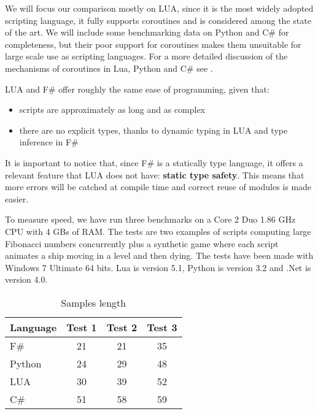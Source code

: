 
We will focus our comparison mostly on LUA, since it is the most widely adopted scripting language, it fully supports coroutines and is considered among the state of the art. We will include some benchmarking data on Python and C\# for completeness, but their poor support for coroutines makes them unsuitable for large scale use as scripting languages. For a more detailed discussion of the mechanisms of coroutines in Lua, Python and C\# see \cite{PYTHON_COROUTINES,LUA_COROUTINES,CSHARP_YIELD}.

LUA and F\# offer roughly the same ease of programming, given that:

\begin{itemize}
\item scripts are approximately as long and as complex
\item there are no explicit types, thanks to dynamic typing in LUA and type inference in F\#
\end{itemize}

It is important to notice that, since F\# is a statically type language, it offers a relevant feature that LUA does not have: \textbf{static type safety}. This means that more errors will be catched at compile time and correct reuse of modules is made easier.

To measure speed, we have run three benchmarks on a Core 2 Duo 1.86 GHz CPU with 4 GBs of RAM. The tests are two examples of scripts computing large Fibonacci numbers concurrently plus a synthetic game where each script animates a ship moving in a level and then dying. The tests have been made with Windows 7 Ultimate 64 bits. Lua is version 5.1, Python is version 3.2 and .Net is version 4.0.

\begin{comment}
The lines of code of each script are, respectively:
\textit{(i)} F\#: 21, 21 and 35; \textit{(ii)} Python: 24, 29, 48; \textit{(iii)} LUA: 30, 39 and 52; and \textit{(iv)} C\#: 51, 58, 59.

The number of yields per second (higher is better) are: \textit{(i)} F\#: 7.6, 5.8 and 4.0; \textit{(ii)} C\#: 7.1, 4.2, 4.1; \textit{(iii)} LUA: 1.5, 1.4 and 0.8; and \textit{(iv)} Python: 1.1, 1.1, 0.9. 
\end{comment}

\begin{table}[ht]
\caption{Samples length}
\centering
\begin{tabular}{ l | c c c }
   Language & Test 1 & Test 2 & Test 3\\
   \hline
   F\# & 21 & 21 & 35  \\
   Python & 24 & 29 & 48 \\
   LUA & 30 & 39 & 52 \\
   C\# & 51 & 58 & 59 \\
 \end{tabular}
 \end{table}


